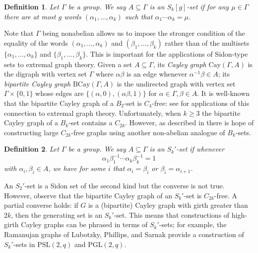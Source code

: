\documentclass[12pt]{article}
\newtheorem{defn}{Definition}
\begin{document}
\begin{defn}
    Let $\Gamma$ be a group. We say $A\subseteq\Gamma$ is an $S_k[g]$-set if for any $\mu\in\Gamma$ there are at most $g$ words $(\alpha_1,\ldots,\alpha_k)$ such that $\alpha_1\cdots\alpha_k=\mu$.
\end{defn}

Note that $\Gamma$ being nonabelian allows us to impose the stronger condition of the equality of the words $(\alpha_1,\ldots,\alpha_k)$ and $(\beta_1,\ldots,\beta_k)$ rather than of the multisets $\{\alpha_1,\ldots,\alpha_k\}$ and $\{\beta_1,\ldots,\beta_k\}$. This is important for the applications of Sidon-type sets to extremal graph theory. Given a set $A\subseteq\Gamma$, its \textit{Cayley graph} $\mathrm{Cay}(\Gamma,A)$ is the digraph with vertex set $\Gamma$ where $\alpha\beta$ is an edge whenever $\alpha^{-1}\beta\in A$; its \textit{bipartite Cayley graph} $\mathrm{BCay}(\Gamma,A)$ is the undirected graph with vertex set $\Gamma\times\{0,1\}$ whose edges are $\{(\alpha,0),(\alpha\beta,1)\}$ for $\alpha\in\Gamma,\beta\in A$. It is well-known that the bipartite Cayley graph of a $B_2$-set is $C_4$-free: see \cite{tait2013sidon,daza2018sidon} for applications of this connection to extremal graph theory. Unfortunately, when $k\ge 3$ the bipartite Cayley graph of a $B_k$-set contains a $C_{2k}$. However, as described in \cite{odlyzko1995nonabelian} there is hope of constructing large $C_{2k}$-free graphs using another non-abelian analogue of $B_k$-sets.

\begin{defn}
    Let $\Gamma$ be a group. We say $A\subseteq\Gamma$ is an $S_k'$-set if whenever
    $$\alpha_1\beta_1^{-1}\cdots\alpha_k\beta_k^{-1}=1$$
    with $\alpha_i,\beta_i\in A$, we have for some $i$ that $\alpha_i=\beta_i$ or $\beta_i=\alpha_{i+1}$. 
\end{defn}

An $S_2'$-set is a Sidon set of the second kind but the converse is not true. However, observe that the bipartite Cayley graph of an $S_k'$-set is $C_{2k}$-free. A partial converse holds: if $G$ is a (bipartite) Cayley graph with girth greater than $2k$, then the generating set is an $S_k'$-set. This means that constructions of high-girth Cayley graphs can be phrased in terms of $S_k'$-sets; for example, the Ramanujan graphs of Lubotzky, Phillips, and Sarnak \cite{lubotzky1988} provide a construction of $S_k'$-sets in $\mathrm{PSL}(2,q)$ and $\mathrm{PGL}(2,q)$.
\end{document}
